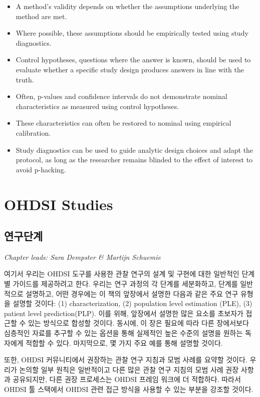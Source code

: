 \documentclass[11pt]{book}
\theoremstyle{definition}
\theoremstyle{definition}
\theoremstyle{definition}
\theoremstyle{remark}
\let\BeginKnitrBlock\begin \let\EndKnitrBlock\end
\begin{document}
\BeginKnitrBlock{rmdsummary}
\begin{itemize}
\item
  A method's validity depends on whether the assumptions underlying the
  method are met.
\item
  Where possible, these assumptions should be empirically tested using
  study diagnostics.
\item
  Control hypotheses, questions where the answer is known, should be
  used to evaluate whether a specific study design produces answers in
  line with the truth.
\item
  Often, p-values and confidence intervals do not demonstrate nominal
  characteristics as measured using control hypotheses.
\item
  These characteristics can often be restored to nominal using empirical
  calibration.
\item
  Study diagnostics can be used to guide analytic design choices and
  adapt the protocol, as long as the researcher remains blinded to the
  effect of interest to avoid p-hacking.
\end{itemize}
\EndKnitrBlock{rmdsummary}

\part{OHDSI Studies}\label{part-ohdsi-studies}

\chapter{연구단계}\label{StudySteps}

\emph{Chapter leads: Sara Dempster \& Martijn Schuemie}

여기서 우리는 OHDSI 도구를 사용한 관찰 연구의 설계 및 구현에 대한
일반적인 단계별 가이드를 제공하려고 한다. 우리는 연구 과정의 각 단계를
세분화하고, 단계를 일반적으로 설명하고, 어떤 경우에는 이 책의 앞장에서
설명한 다음과 같은 주요 연구 유형을 설명할 것이다: (1) characterization,
(2) population level estimation (PLE), (3) patient level
prediction(PLP). 이를 위해, 앞장에서 설명한 많은 요소를 초보자가 접근할
수 있는 방식으로 합성할 것이다. 동시에, 이 장은 필요에 따라 다른
장에서보다 심층적인 자료를 추구할 수 있는 옵션을 통해 실제적인 높은
수준의 설명을 원하는 독자에게 적합할 수 있다. 마지막으로, 몇 가지 주요
예를 통해 설명할 것이다.

또한, OHDSI 커뮤니티에서 권장하는 관찰 연구 지침과 모범 사례를 요약할
것이다. 우리가 논의할 일부 원칙은 일반적이고 다른 많은 관찰 연구 지침의
모범 사례 권장 사항과 공유되지만, 다른 권장 프로세스는 OHDSI 프레임
워크에 더 적합하다. 따라서 OHDSI 툴 스택에서 OHDSI 관련 접근 방식을
사용할 수 있는 부분을 강조할 것이다.
\end{document}
